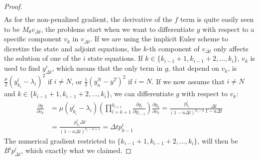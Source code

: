 \begin{proof}
\begin{align*}
\end{align*} 
As for the non-penalized gradient, the derivative of the $f$ term is quite easily seen to be $M_{\theta}v_{\Delta t}$, the problems start when we want to differentiate $g$ with respect to a specific component $v_k$ in $v_{\Delta t}$. If we are using the implicit Euler scheme to dicretize the state and adjoint equations, the $k$-th component of $v_{\Delta t}$ only affects the solution of one of the $i$ state equations. If $k\in \{k_{i-1}+1,k_{i-1}+2,...,k_{i}\}$, $v_k$ is used to find $y_{\Delta t}^i$, which means that the only term in $g$, that depend on $v_k$, is  $\frac{\mu }{2}(y_{k_i}^{i}-\lambda_i)^2$ if $i\neq N$, or $\frac{1}{2}(y_n^N-y^T)^2$ if $i=N$. If we now assume that $i\neq N$ and $k\in \{k_{i-1}+1,k_{i-1}+2,...,k_{i}\}$, we can differentiate $g$ with respect to $v_k$:
\begin{align*}
\frac{\partial g}{\partial v_k} &=\mu( y_{k_i}^{i}-\lambda_i) (\prod_{l=k+1}^{k_{i+1}}\frac{\partial y_{l}}{\partial y_{l-1}}) \frac{\partial y_k}{\partial v_{k}} = \frac{p_{k_i}^i}{(1-a\Delta t)^{k_{i}-k}}\frac{\Delta t}{1-a\Delta t} \\
&= \frac{p_{k_i}^i\Delta t}{(1-a\Delta t)^{k_i-k+1}}=\Delta t p_{k-1}^i
\end{align*}
The numerical gradient restricted to $ \{k_{i-1}+1,k_{i-1}+2,...,k_{i}\}$, will then be $B^ip_{\Delta t}^i$, which exactly what we claimed.
\end{proof}
